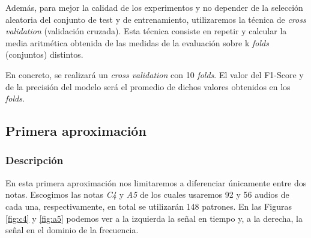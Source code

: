 \documentclass[12pt]{article}
\begin{document}
\bigskip
Además, para mejor la calidad de los experimentos y no depender de la selección aleatoria del conjunto de test y de entrenamiento, utilizaremos
la técnica de \textit{cross validation} (validación cruzada). Esta técnica consiste en repetir y calcular la media aritmética obtenida de las medidas de la evaluación 
sobre k \textit{folds} (conjuntos) distintos.

En concreto, se realizará un \textit{cross validation} con 10 \textit{folds}. El valor del F1-Score y de la precisión
del modelo será el promedio de dichos valores obtenidos en los \textit{folds}.

\subsection{Primera aproximación}
\label{Primera aproximación}

\subsubsection{Descripción}
En esta primera aproximación nos limitaremos a diferenciar únicamente entre dos notas. 
Escogimos las notas \textit{C4} y \textit{A5} de los cuales usaremos 92 y 56 audios de cada una, respectivamente, en total
se utilizarán 148 patrones. En las Figuras \ref{fig:c4} y \ref{fig:a5} podemos ver a la izquierda la señal en tiempo y, a la derecha,
la señal en el dominio de la frecuencia.
\end{document}
